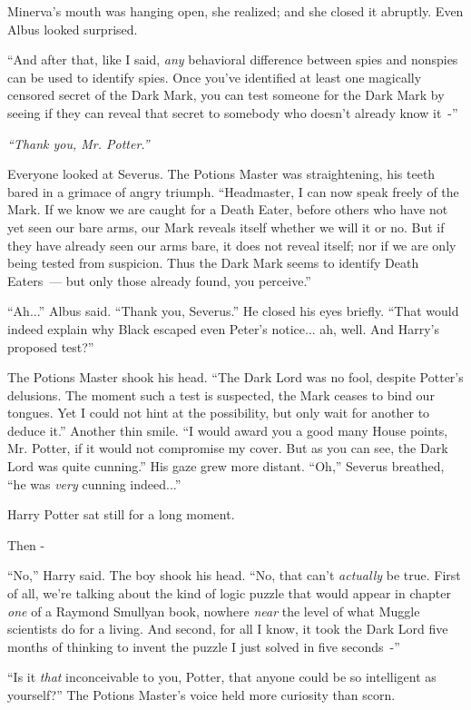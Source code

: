 Minerva's mouth was hanging open, she realized; and she closed it abruptly. Even Albus looked surprised.

``And after that, like I said, \emph{any} behavioral difference between spies and nonspies can be used to identify spies. Once you've identified at least one magically censored secret of the Dark Mark, you can test someone for the Dark Mark by seeing if they can reveal that secret to somebody who doesn't already know it~-''

\emph{``Thank you, Mr. Potter.''}

Everyone looked at Severus. The Potions Master was straightening, his teeth bared in a grimace of angry triumph. ``Headmaster, I can now speak freely of the Mark. If we know we are caught for a Death Eater, before others who have not yet seen our bare arms, our Mark reveals itself whether we will it or no. But if they have already seen our arms bare, it does not reveal itself; nor if we are only being tested from suspicion. Thus the Dark Mark seems to identify Death Eaters~--- but only those already found, you perceive.''

``Ah...'' Albus said. ``Thank you, Severus.'' He closed his eyes briefly. ``That would indeed explain why Black escaped even Peter's notice... ah, well. And Harry's proposed test?''

The Potions Master shook his head. ``The Dark Lord was no fool, despite Potter's delusions. The moment such a test is suspected, the Mark ceases to bind our tongues. Yet I could not hint at the possibility, but only wait for another to deduce it.'' Another thin smile. ``I would award you a good many House points, Mr. Potter, if it would not compromise my cover. But as you can see, the Dark Lord was quite cunning.'' His gaze grew more distant. ``Oh,'' Severus breathed, ``he was \emph{very} cunning indeed...''

Harry Potter sat still for a long moment.

Then -

``No,'' Harry said. The boy shook his head. ``No, that can't \emph{actually} be true. First of all, we're talking about the kind of logic puzzle that would appear in chapter \emph{one} of a Raymond Smullyan book, nowhere \emph{near} the level of what Muggle scientists do for a living. And second, for all I know, it took the Dark Lord five months of thinking to invent the puzzle I just solved in five seconds~-''

``Is it \emph{that} inconceivable to you, Potter, that anyone could be so intelligent as yourself?'' The Potions Master's voice held more curiosity than scorn.

